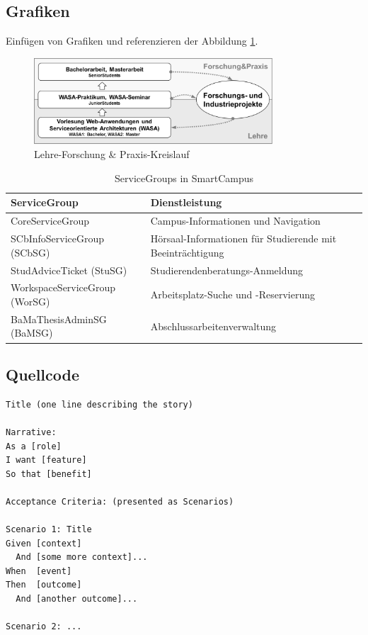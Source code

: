 \subsection{Grafiken}
Einfügen von Grafiken und referenzieren der Abbildung \ref{fig:lehre}.
\begin{figure}[h]
	\centering
	\includegraphics[width=0.8\textwidth]{images/lehre_kreislauf.png}
	\caption{Lehre-Forschung \& Praxis-Kreislauf}
	\label{fig:lehre}
\end{figure}

\begin{table}
	\centering
	\begin{tabular}{ | l | p{7cm} | }
		\hline
		ServiceGroup & Dienstleistung \\
		\hline
		 CoreServiceGroup & Campus-Informationen und Navigation \\
	 	\hline
	 	SCbInfoServiceGroup (SCbSG) & Hörsaal-Informationen für Studierende mit Beeinträchtigung \\
	 	\hline
	 	 StudAdviceTicket (StuSG) & Studierendenberatungs-Anmeldung \\
	 	\hline
	 	WorkspaceServiceGroup (WorSG) & Arbeitsplatz-Suche und -Reservierung \\
	 	\hline
	 	BaMaThesisAdminSG (BaMSG) & Abschlussarbeitenverwaltung \\
	 	\hline
	\end{tabular}
	\caption{ServiceGroups in SmartCampus}
	\label{tab:smartcampus-servicegroups}
\end{table}

\subsection{Quellcode}
\vspace{0.5cm}
\begin{lstlisting}[caption = {Vorlage für eine Story und Szenarien nach BDD}, label = {lst:bdd-stories-szenarien-template}, style = kit-cm, language = Gherkin]
Title (one line describing the story)
 
Narrative:
As a [role]
I want [feature]
So that [benefit]
 
Acceptance Criteria: (presented as Scenarios)
 
Scenario 1: Title
Given [context]
  And [some more context]...
When  [event]
Then  [outcome]
  And [another outcome]...
 
Scenario 2: ...
\end{lstlisting}

